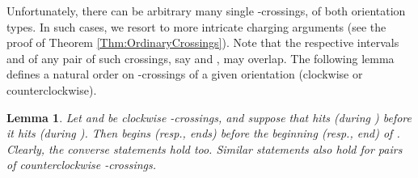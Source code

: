 \documentclass[letter,11pt]{article}
\newtheorem{lemma}[theorem]{Lemma}
\begin{document}
Unfortunately, there can be arbitrary many single -crossings, of both orientation types. In such cases, we resort to more intricate charging arguments (see the proof of Theorem \ref{Thm:OrdinaryCrossings}). Note that the respective intervals  and  of any pair of such crossings, say  and , may overlap.
The following lemma defines a natural order on -crossings of a given orientation (clockwise or counterclockwise).



\begin{lemma}\label{Lemma: OrderOrdinaryCrossings}
Let  and  be clockwise -crossings, and suppose that  hits  (during ) before it hits  (during ). Then  begins (resp., ends) before the beginning (resp., end) of . Clearly, the converse statements hold too. Similar statements also hold for pairs of counterclockwise -crossings.
\end{lemma}
\end{document}
